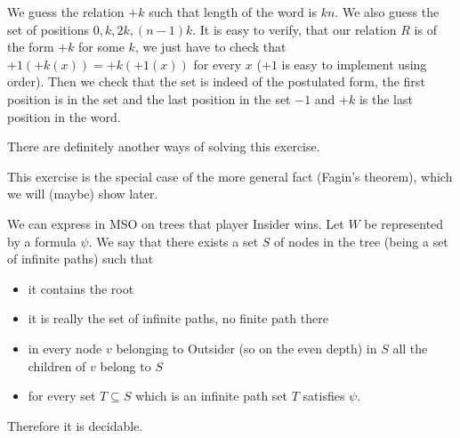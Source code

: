 {
We guess the relation $+k$ such that length of the word is $kn$.
We also guess the set of positions $0, k, 2k, (n-1)k$.
It is easy to verify, that our relation $R$ is of the form $+k$ for some $k$, we just
have to check that $+1(+k(x)) = +k(+1(x))$ for every $x$ ($+1$ is easy to implement using order).
Then we check that the set is indeed of the postulated form, the first position is in the set
and the last position in the set $-1$ and $+k$ is the last position in the word.

There are definitely another ways of solving this exercise.

This exercise is the special case of the more general fact (Fagin's theorem), which we will (maybe) show later.
}





{
We can express in MSO on trees that player Insider wins.
Let $W$ be represented by a formula $\psi$. We say that there exists a set $S$ of nodes in the tree (being
a set of infinite paths) such that
\begin{itemize}
  \item it contains the root
  \item it is really the set of infinite paths, no finite path there
  \item in every node $v$ belonging to Outsider (so on the even depth) in $S$ all the children of $v$ belong to $S$
  \item for every set $T \subseteq S$ which is an infinite path set $T$ satisfies $\psi$.
\end{itemize}
Therefore it is decidable.
}
